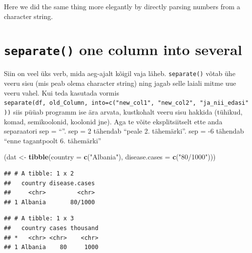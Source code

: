 \documentclass[]{book}
\newenvironment{Shaded}{\begin{snugshade}}{\end{snugshade}}
\newcommand{\KeywordTok}[1]{\textcolor[rgb]{0.13,0.29,0.53}{\textbf{#1}}}
\newcommand{\DataTypeTok}[1]{\textcolor[rgb]{0.13,0.29,0.53}{#1}}
\newcommand{\StringTok}[1]{\textcolor[rgb]{0.31,0.60,0.02}{#1}}
\newcommand{\OperatorTok}[1]{\textcolor[rgb]{0.81,0.36,0.00}{\textbf{#1}}}
\newcommand{\NormalTok}[1]{#1}
\begin{document}
Here we did the same thing more elegantly by directly parsing numbers
from a character string.

\section{\texorpdfstring{\texttt{separate()} one column into
several}{separate() one column into several}}\label{separate-one-column-into-several}

Siin on veel üks verb, mida aeg-ajalt kõigil vaja läheb.
\texttt{separate()} võtab ühe veeru sisu (mis peab olema character
string) ning jagab selle laiali mitme uue veeru vahel. Kui teda kasutada
vormis
\texttt{separate(df,\ old\_Column,\ into=c("new\_col1",\ "new\_col2",\ "ja\_nii\_edasi"))}
siis püüab programm ise ära arvata, kustkohalt veeru sisu hakkida
(tühikud, komad, semikoolonid, koolonid jne). Aga te võite
eksplitsiitselt ette anda separaatori sep = ``''. sep = 2 tähendab
``peale 2. tähemärki''. sep = -6 tähendab ``enne tagantpoolt 6.
tähemärki''

\begin{Shaded}
\begin{Highlighting}[]
\NormalTok{(dat <-}\StringTok{ }\KeywordTok{tibble}\NormalTok{(}\DataTypeTok{country =} \KeywordTok{c}\NormalTok{(}\StringTok{"Albania"}\NormalTok{), }\DataTypeTok{disease.cases =} \KeywordTok{c}\NormalTok{(}\StringTok{"80/1000"}\NormalTok{)))}
\end{Highlighting}
\end{Shaded}

\begin{verbatim}
## # A tibble: 1 x 2
##   country disease.cases
##     <chr>         <chr>
## 1 Albania       80/1000
\end{verbatim}

\begin{Shaded}
\end{Shaded}

\begin{verbatim}
## # A tibble: 1 x 3
##   country cases thousand
## *   <chr> <chr>    <chr>
## 1 Albania    80     1000
\end{verbatim}
\end{document}
